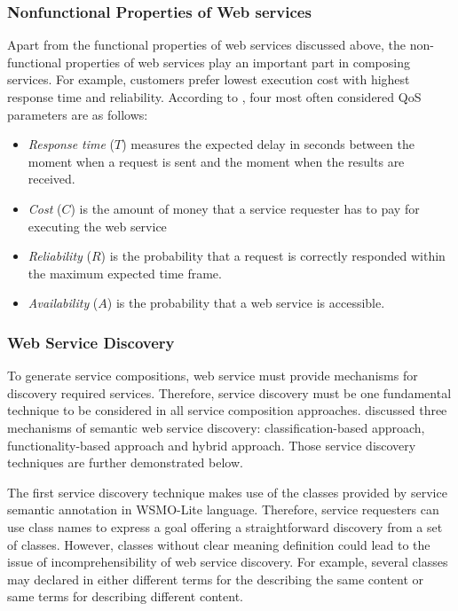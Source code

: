 \subsubsection{Nonfunctional Properties of Web services}\label{nonfunctional}
Apart from the functional properties of web services discussed above, the non-functional properties of web services play an important part in composing services. For example, customers prefer lowest execution cost with highest response time and reliability. According to \cite{zeng2003quality}, four most often considered QoS parameters are as follows:
\begin{itemize}
\item \textit{Response time} ($T$) measures the expected delay in seconds between the moment when a request is sent and the moment when the results are received.
\item \textit{Cost} ($C$) is the amount of money that a service requester has to pay for executing the web service
\item \textit{Reliability} ($R$) is the probability that a request is correctly responded within the maximum expected time frame.
\item \textit{Availability} ($A$) is the probability that a web service is accessible.
\end{itemize}

\subsubsection{Web Service Discovery}\label{servicediscovery}
To generate service compositions, web service must provide mechanisms for discovery required services. Therefore, service discovery must be one fundamental technique to be considered in all service composition approaches. \cite{agarwal2009d5} discussed three mechanisms of semantic web service discovery: classification-based approach, functionality-based approach and hybrid approach. Those service discovery techniques are further demonstrated below.

The first service discovery technique makes use of the classes provided by service semantic annotation in WSMO-Lite language. Therefore, service requesters can use class names to express a goal offering a straightforward discovery from a set of classes. However, classes without clear meaning definition could lead to the issue of incomprehensibility of web service discovery. For example, several classes may declared in either different terms for the describing the same content or same terms for describing different content.

